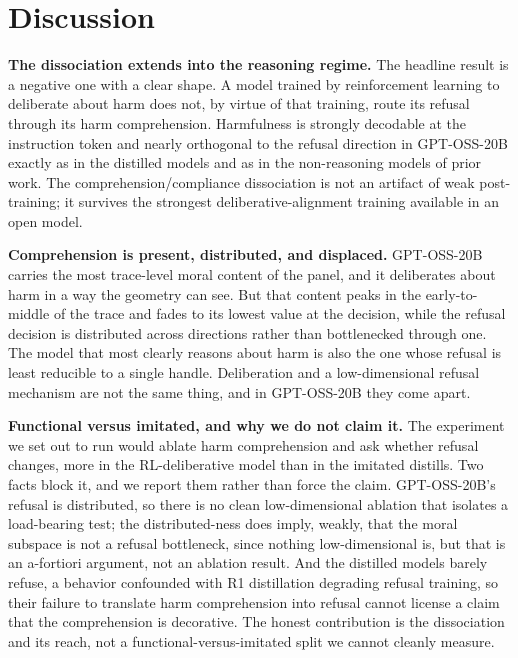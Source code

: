 \section{Discussion}\label{discussion}

\textbf{The dissociation extends into the reasoning regime.} The headline result is a
negative one with a clear shape. A model trained by reinforcement learning to
deliberate about harm does not, by virtue of that training, route its refusal
through its harm comprehension. Harmfulness is strongly decodable at the instruction
token and nearly orthogonal to the refusal direction in GPT-OSS-20B exactly as in
the distilled models and as in the non-reasoning models of prior work. The
comprehension/compliance dissociation is not an artifact of weak post-training; it
survives the strongest deliberative-alignment training available in an open model.

\textbf{Comprehension is present, distributed, and displaced.} GPT-OSS-20B carries the
most trace-level moral content of the panel, and it deliberates about harm in a way
the geometry can see. But that content peaks in the early-to-middle of the trace and
fades to its lowest value at the decision, while the refusal decision is distributed
across directions rather than bottlenecked through one. The model that most clearly
reasons about harm is also the one whose refusal is least reducible to a single
handle. Deliberation and a low-dimensional refusal mechanism are not the same thing,
and in GPT-OSS-20B they come apart.

\textbf{Functional versus imitated, and why we do not claim it.} The experiment we set
out to run would ablate harm comprehension and ask whether refusal changes, more in
the RL-deliberative model than in the imitated distills. Two facts block it, and we
report them rather than force the claim. GPT-OSS-20B's refusal is distributed, so
there is no clean low-dimensional ablation that isolates a load-bearing test; the
distributed-ness does imply, weakly, that the moral subspace is not a refusal
bottleneck, since nothing low-dimensional is, but that is an a-fortiori argument, not
an ablation result. And the distilled models barely refuse, a behavior confounded
with R1 distillation degrading refusal training, so their failure to translate harm
comprehension into refusal cannot license a claim that the comprehension is
decorative. The honest contribution is the dissociation and its reach, not a
functional-versus-imitated split we cannot cleanly measure.

